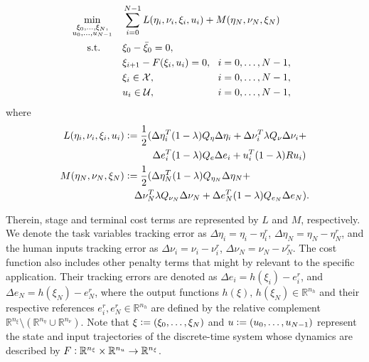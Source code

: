 \begin{problem}
\begin{subequations}
{\!\!\!\!\!}{\!\!}\begin{align}
&\underset{\begin{subarray}{c}
\xi_0, \dots, \xi_N, \\
u_0, \dots, u_{N-1}
\end{subarray}}{\min}	    &&\sum_{i=0}^{N-1} L(\eta_i, \nu_i, \xi_i, u_i) + M(\eta_N, \nu_N,\xi_N)\\
&\,\,\,\quad \textnormal{s.t.}    &&\xi_0 - \Bar{\xi}_0 = 0, \label{eq:a}\\
& 						    &&\xi_{i+1} - F(\xi_i,u_i) = 0, \,\,\,\, i = 0,\dots, N-1,\\
& 						    &&\xi_i\in \mathcal{X}, \,\,\,\,\,\,\,\,\,\,\,\,\,\,\,\,\,\,\,\,\,\,\,\,\,\,\,\,\,\,\,\,\,\,\,\,\,\, i = 0,\dots, N-1,\label{eq:c}\\
& 						    &&u_i\in \mathcal{U},\label{eq:d} \,\,\,\,\,\,\,\,\,\,\,\,\,\,\,\,\,\,\,\,\,\,\,\,\,\,\,\,\,\,\,\,\,\,\,\,\,\, i = 0,\dots, N-1,
\end{align}{\!\!\!}
\end{subequations} where
\begin{equation*}
\begin{aligned}
		L(\eta_i, \nu_i, \xi_i, u_i) &\vcentcolon = \frac{1}{2}(\Delta\eta_i^T(1-\lambda)Q_{\eta}\Delta\eta_i + \Delta\nu_i^T\lambda Q_\nu\Delta\nu_i + \\
		& \,\,\,\,\,\,\,\,\,\,\,\,\,\,\,\,\,\Delta e_i^T(1-\lambda)Q_e\Delta e_i + u_i^T(1-\lambda)Ru_i)\\
		M(\eta_N, \nu_N,\xi_N) &\vcentcolon = \frac{1}{2}(\Delta\eta_N^T(1-\lambda)Q_{\eta_N}\Delta\eta_N + \\
		& \,\,\,\,\,\,\Delta\nu_N^T\lambda Q_{\nu_N}\Delta\nu_N + \Delta e_N^T(1-\lambda)Q_{e_N}\Delta e_N).
\end{aligned}
\end{equation*}\label{problem:mi}%
\end{problem}
Therein, stage and terminal cost terms are represented by $L$ and $M$, respectively. We denote the task variables tracking error as $\Delta\eta_i = \eta_i - \eta_i^r$, $\Delta\eta_N = \eta_N - \eta_N^r$, and the human inputs tracking error as $\Delta\nu_i = \nu_i - \nu_i^r$, $\Delta\nu_N = \nu_N - \nu_N^r$. The cost function also includes other penalty terms that might by relevant to the specific application. Their tracking errors are denoted as $\Delta e_i = h(\xi_i)-e_i^r$, and $\Delta e_N = h(\xi_N)-e_N^r$, where the output functions $h(\xi),\, h(\xi_N) \in \mathbb{R}^{n_h}$ and their respective references $e_i^r, e_N^r \in \mathbb{R}^{n_h}$ are defined by the relative complement $\mathbb{R}^{n_\xi} \setminus (\mathbb{R}^{n_\eta} \cup \mathbb{R}^{n_\nu})$. Note that $\xi \vcentcolon = (\xi_0, \dots, \xi_N)$ and $u \vcentcolon = (u_0,\dots,u_{N-1})$ represent the state and input trajectories of the discrete-time system whose dynamics are described by $F \vcentcolon \mathbb{R}^{n_{\xi}} \times \mathbb{R}^{n_u} \rightarrow \mathbb{R}^{n_{\xi}}$. 

